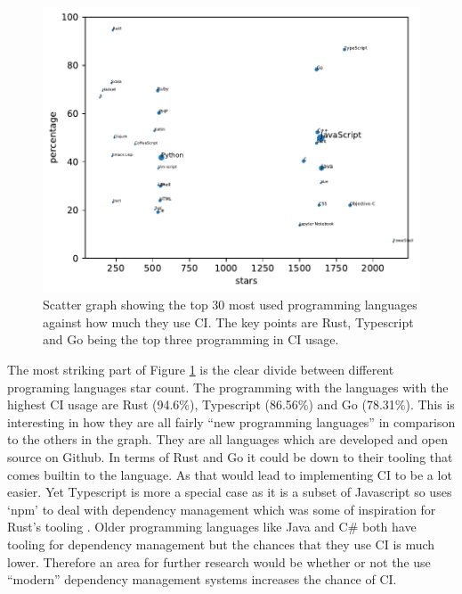 \documentclass[twoside,12pt,titlepage,a4paper]{article}
\begin{document}
\begin{figure}[!h]
  \centering
  \includegraphics[width=.8\textwidth]{../src/results/languages-scatter-CI.pdf}
  \caption{Scatter graph showing the top 30 most used programming languages against how much they use CI. The key points are Rust, Typescript and Go being the top three programming in CI usage.}
  \label{graph:scatter_langauges_CI}
\end{figure}


The most striking part of Figure \ref{graph:scatter_langauges_CI} is the clear divide between different programing languages star count. The programming with the languages with the highest CI usage are Rust (94.6\%), Typescript (86.56\%) and Go (78.31\%). This is interesting in how they are all fairly \enquote{new programming languages} in comparison to the others in the graph. They are all languages which are developed and open source on Github. In terms of Rust and Go it could be down to their tooling that comes builtin to the language. As that would lead to implementing CI to be a lot easier. Yet Typescript is more a special case as it is a subset of Javascript so uses `npm' to deal with dependency management which was some of inspiration for Rust's tooling \citet{RustBlogCargo}. Older programming languages like Java and C\# both have tooling for dependency management but the chances that they use CI is much lower. Therefore an area for further research would be whether or not the use \enquote{modern} dependency management systems increases the chance of CI.
\end{document}
